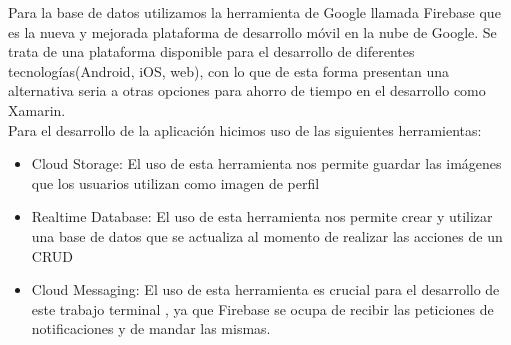 Para la base de datos utilizamos la herramienta de Google llamada Firebase que es la nueva y mejorada plataforma de desarrollo móvil en la nube de Google. 
Se trata de una plataforma disponible para el desarrollo de diferentes tecnologías(Android, iOS, web), con lo que de esta forma presentan una alternativa seria a otras opciones para ahorro de tiempo en el desarrollo como Xamarin\cite{Referencia20}.\\
Para el desarrollo de la aplicación hicimos uso de las siguientes herramientas:

\begin{itemize}
\item Cloud Storage: El uso de esta herramienta nos permite guardar las imágenes que los usuarios utilizan como imagen de perfil
\item Realtime Database: El uso de esta herramienta nos permite crear y utilizar una base de datos que se actualiza al momento de realizar las acciones de un CRUD
\item Cloud Messaging: El uso de esta herramienta es crucial para el desarrollo de este trabajo terminal , ya que Firebase se ocupa de recibir las peticiones de notificaciones y de mandar las mismas.

%	
%	
%	




	
\end{itemize}


